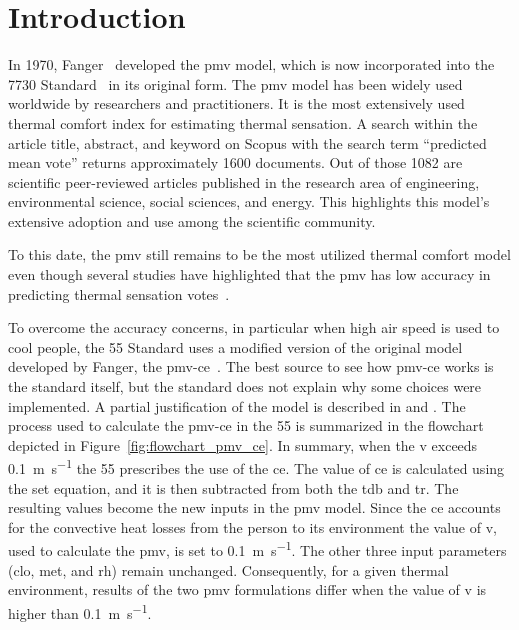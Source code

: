 \section{Introduction}\label{sec:introduction}
In 1970, Fanger~\cite{Fanger1970} developed the \ac{pmv} model, which is now incorporated into the \gls{7730} Standard~\cite{iso7730} in its original form.
The \ac{pmv} model has been widely used worldwide by researchers and practitioners.
It is the most extensively used thermal comfort index for estimating thermal sensation.
A search within the article title, abstract, and keyword on Scopus with the search term ``predicted mean vote'' returns approximately 1600 documents.
Out of those 1082 are scientific peer-reviewed articles published in the research area of engineering, environmental science, social sciences, and energy.
This highlights this model's extensive adoption and use among the scientific community.

To this date, the \ac{pmv} still remains to be the most utilized thermal comfort model even though several studies have highlighted that the \ac{pmv} has low accuracy in predicting thermal sensation votes~\cite{Cheung2019, Yao2022, kim2019thermal, tartarini2018thermal, Humphreys2002, doherty_evaluation_1988}.

To overcome the accuracy concerns, in particular when high air speed is used to cool people, the \gls{55} Standard uses a modified version of the original model developed by Fanger, the \ac{pmv-ce}~\cite{ashrae552023}.
The best source to see how \ac{pmv-ce} works is the standard itself, but the standard does not explain why some choices were implemented. 
A partial justification of the model is described in  and .
The process used to calculate the \ac{pmv-ce} in the \gls{55} is summarized in the flowchart depicted in Figure~\ref{fig:flowchart_pmv_ce}.
In summary, when the \ac{v} exceeds \qty{0.1}{\m\per\s} the \gls{55} prescribes the use of the \ac{ce}.
The value of \ac{ce} is calculated using the \ac{set} equation, and it is then subtracted from both the \ac{tdb} and \ac{tr}.
The resulting values become the new inputs in the \ac{pmv} model.
Since the \ac{ce} accounts for the convective heat losses from the person to its environment the value of \ac{v}, used to calculate the \ac{pmv}, is set to \qty{0.1}{\m\per\s}.
The other three input parameters (\ac{clo}, \ac{met}, and \ac{rh}) remain unchanged.
Consequently, for a given thermal environment, results of the two \ac{pmv} formulations differ when the value of \ac{v} is higher than \qty{0.1}{\m\per\s}.

